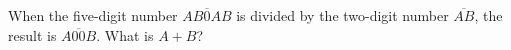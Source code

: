 When the five-digit number \(\overline{AB0AB}\) is divided by the two-digit number \(\overline{AB}\), the result is \(\overline{A00B}\). What is \(A+B\)?
